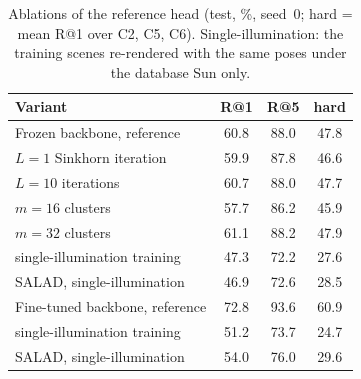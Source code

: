 \begin{table}[t]
\centering
\caption{Ablations of the reference head (test, \%, seed~0; hard = mean R@1 over C2, C5, C6). Single-illumination: the training scenes re-rendered with the same poses under the database Sun only.}
\label{tab:ablation}
\footnotesize
\setlength{\tabcolsep}{3.5pt}
\begin{tabular}{@{}lccc@{}}
\toprule
Variant & R@1 & R@5 & hard \\
\midrule
Frozen backbone, reference & 60.8 & 88.0 & 47.8 \\
\quad $L=1$ Sinkhorn iteration & 59.9 & 87.8 & 46.6 \\
\quad $L=10$ iterations & 60.7 & 88.0 & 47.7 \\
\quad $m=16$ clusters & 57.7 & 86.2 & 45.9 \\
\quad $m=32$ clusters & 61.1 & 88.2 & 47.9 \\
\quad single-illumination training & 47.3 & 72.2 & 27.6 \\
\quad SALAD, single-illumination & 46.9 & 72.6 & 28.5 \\
\midrule
Fine-tuned backbone, reference & 72.8 & 93.6 & 60.9 \\
\quad single-illumination training & 51.2 & 73.7 & 24.7 \\
\quad SALAD, single-illumination & 54.0 & 76.0 & 29.6 \\
\bottomrule
\end{tabular}
\end{table}